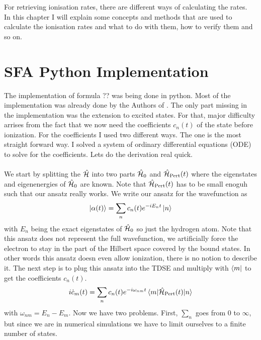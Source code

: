 For retrieving ionisation rates, there are different ways of calculating the rates.\\
In this chapter I will explain some concepts and methods that are used to calculate the ionisation rates and what to do with them, how to verify them and so on.





\section{SFA Python Implementation}
The implementation of formula ?? was being done in python. Most of the implementation was already done by the Authors of \cite{Theory_NPS}.
The only part missing in the implementation was the extension to excited states. 
For that, major difficulty arrises from the fact that we now need the coefficients $c_n(t)$ of the state before ionization.
For the coefficients I used two different ways. The one is the most straight forward way. 
I solved a system of ordinary differential equations (ODE) to solve for the coefficients.
Lets do the derivation real quick.\\\\
We start by splitting the $\hat{\mathcal{H}}$ into two parts $\hat{\mathcal{H}}_0$ and $\hat{\mathcal{H}}_{\mathrm{Pert}}(t)$ where the eigenstates and eigenenergies of $\hat{\mathcal{H}}_0$ are known. 
Note that $\hat{\mathcal{H}}_{\mathrm{Pert}}(t)$ has to be small enoguh such that our ansatz really works.
We write our ansatz for the wavefunction as
\begin{equation*}
    \ket{\alpha(t)} = \sum_n c_n(t) e^{-i E_n t} \ket{n}
\end{equation*}
with $E_n$ being the exact eigenstates of $\hat{\mathcal{H}}_0$ so just the hydrogen atom. 
Note that this ansatz does not represent the full wavefunction, we artificially force the electron to stay in the part of the Hilbert space covered by the bound states.
In other words this ansatz doesn even allow ionization, there is no notion to describe it.
The next step is to plug this ansatz into the TDSE and multiply with $\bra{m}$ to get the coefficients $c_n(t)$.
\begin{equation*}
    i  \dot{c}_m(t) = \sum_n c_n(t) e^{-i \omega_{nm} t} \braket{m|\hat{\mathcal{H}}_{\mathrm{Pert}}(t)|n}  \label{eq:ode}
\end{equation*}
with $\omega_{nm} = E_n - E_m$.
Now we have two problems.
First, $\sum_n$ goes from $0$ to $\infty$, but since we are in numerical simulations we have to limit ourselves to a finite number of states.
